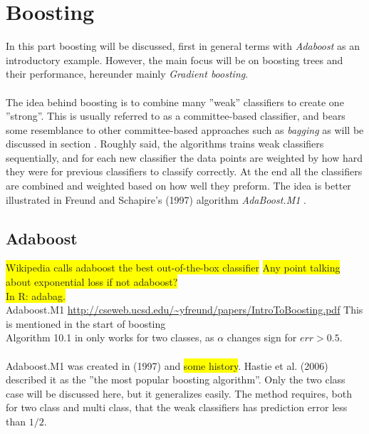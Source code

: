 \section{Boosting}
\label{sec:Boosting}
In this part boosting will be discussed, first in general terms with \textit{Adaboost} as an introductory example. However, the main focus will be on boosting trees and their performance, hereunder mainly \textit{Gradient boosting}. \\
\\
The idea behind boosting is to combine many ''weak'' classifiers to create one ''strong''. This is usually referred to as a committee-based classifier, and bears some resemblance to other committee-based approaches such as \textit{bagging} as will be discussed in section . Roughly said, the algorithms trains weak classifiers sequentially, and for each new classifier the data points are weighted by how hard they were for previous classifiers to classify correctly. At the end all the classifiers are combined and weighted based on how well they preform. The idea is better illustrated in Freund and Schapire's (1997)  algorithm \textit{AdaBoost.M1} \cite{adaboostM1}.
\subsection{Adaboost}
\label{sub:Adaboost}
\colorbox{yellow}{Wikipedia calls adaboost the best out-of-the-box classifier}
\colorbox{yellow}{Any point talking about exponential loss if not adaboost?}\\
\colorbox{yellow}{In R: adabag.}\\
Adaboost.M1 \url{http://cseweb.ucsd.edu/~yfreund/papers/IntroToBoosting.pdf} This is mentioned in the start of boosting \cite{modstat} \\
Algorithm 10.1 in \cite{modstat} only works for two classes, as $\alpha$ changes sign for $err > 0.5$. \\
\\
Adaboost.M1 was created in (1997)  and \colorbox{yellow}{some history}. Hastie et al. (2006) \cite{modstat} described it as the ''the most popular boosting algorithm''. Only the two class case will be discussed here, but it generalizes easily. The method requires, both for two class and multi class, that the weak classifiers has prediction error less than $1/2$.

